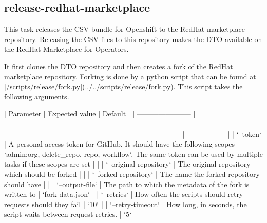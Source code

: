 \subsection{release-redhat-marketplace}\label{subsec:release-redhat-marketplace}

This task releases the CSV bundle for Openshift to the RedHat marketplace repository.
Releasing the CSV files to this repository makes the DTO available on the RedHat Marketplace for Operators.

It first clones the DTO repository and then creates a fork of the RedHat marketplace repository.
Forking is done by a python script that can be found at [/scripts/release/fork.py](../../scripts/release/fork.py).
This script takes the following arguments.

| Parameter               | Expected value                                                                                                                                                                         | Default          |
| ----------------------- | -------------------------------------------------------------------------------------------------------------------------------------------------------------------------------------- | ---------------- |
| `--token`               | A personal access token for GitHub. It should have the following scopes `admin:org, delete_repo, repo, workflow`. The same token can be used by multiple tasks if these scopes are set |                  |
| `--original-repository` | The original repository which should be forked                                                                                                                                         |                  |
| `--forked-repository`   | The name the forked repository should have                                                                                                                                             |                  |
| `--output-file`         | The path to which the metadata of the fork is written to                                                                                                                               | `fork-data.json` |
| `--retries`             | How often the scripts should retry requests should they fail                                                                                                                           | `10`             |
| `--retry-timeout`       | How long, in seconds, the script waits between request retries.                                                                                                                        | `5`              |

